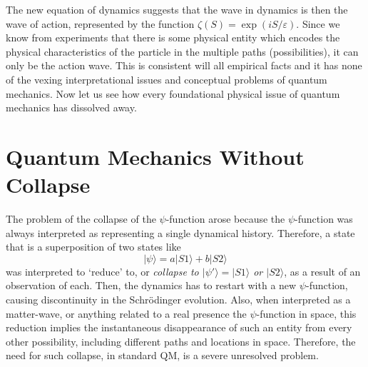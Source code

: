 The new equation of dynamics suggests that the wave in dynamics is then the wave
of action, represented by the function $\zeta (S) = \exp(iS/\varepsilon)$. Since we know from experiments
that there is some physical entity which encodes the physical characteristics of the particle
in the multiple paths (possibilities), it can only be the action wave. This is consistent will
all empirical facts and it has none of the vexing interpretational issues and conceptual problems of quantum mechanics. 
Now let us see how every foundational physical issue of quantum mechanics has dissolved away.

\section{Quantum Mechanics Without Collapse}\label{c14-sec5}

The problem of the collapse of the $\psi$-function arose because the $\psi$-function was always
interpreted as representing a single dynamical history. Therefore, a state that is a superposition of two states like
\begin{equation*}
|\psi \rangle = a |S1 \rangle + b |S2 \rangle \tag{27}\label{c14-eq27}
\end{equation*}
was interpreted to  `reduce' to, or \textit{collapse to $|\psi' \rangle = |S1 \rangle$  or $|S2 \rangle$}, as a result of an observation of each. 
Then, the dynamics has to restart with a new $\psi$-function, causing discontinuity
in the Schr\"{o}dinger evolution. Also, when interpreted as a matter-wave, or anything related to a real presence the $\psi$-function in space, this reduction implies the instantaneous disappearance of such an entity from every other possibility, including different paths and locations in space. 
Therefore, the need for such collapse, in standard QM, is a severe unresolved problem.

